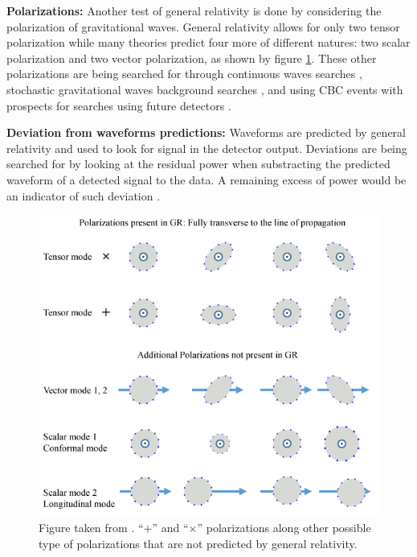 \vspace{0.2cm}
\textbf{Polarizations:} Another test of general relativity is done by considering the polarization of gravitational waves.
General relativity allows for only two tensor polarization while many theories predict four more of different natures: two scalar polarization and two vector polarization, as shown by figure \ref{fig:other_polarization}.
These other polarizations are being searched for through continuous waves searches \cite{other_polarization_cw}, stochastic gravitational waves background searches \cite{polarization}, and using CBC events with prospects for searches using future detectors \cite{testingGR,other_polarization_cbc}.

\vspace{0.2cm}
\textbf{Deviation from waveforms predictions:} Waveforms are predicted by general relativity and used to look for signal in the detector output.
Deviations are being searched for by looking at the residual power when substracting the predicted waveform of a detected signal to the data.
A remaining excess of power would be an indicator of such deviation \cite{testingGR}.
%
\begin{figure}
  \centering
  \includegraphics[width=0.6\linewidth]{sectionGW/other_polarization.png}
  \caption{Figure taken from \cite{other_polarization}. ``$+$'' and ``$\times$'' polarizations along other possible type of polarizations that are not predicted by general relativity.}
  \label{fig:other_polarization}
\end{figure}
%


